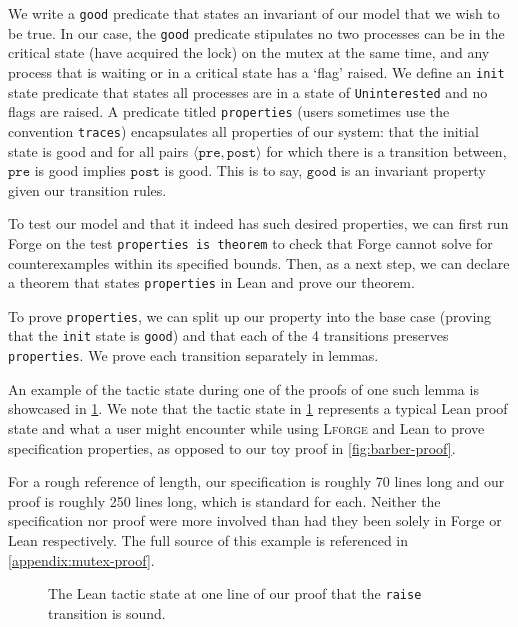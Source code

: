 We write a \texttt{good} predicate that states an invariant of our model that we wish to be true. In our case, the \texttt{good} predicate stipulates no two processes can be in the critical state (have acquired the lock) on the mutex at the same time, and any process that is waiting or in a critical state has a `flag' raised. We define an \texttt{init} state predicate that states all processes are in a state of \texttt{Uninterested} and no flags are raised. A predicate titled \texttt{properties} (users sometimes use the convention \texttt{traces}) encapsulates all properties of our system: that the initial state is good and for all pairs $\langle\texttt{pre}, \texttt{post}\rangle$ for which there is a transition between, $\texttt{pre}$ is good implies $\texttt{post}$ is good. This is to say, $\texttt{good}$ is an invariant property given our transition rules. 

To test our model and that it indeed has such desired properties, we can first run Forge on the test \texttt{properties is theorem} to check that Forge cannot solve for counterexamples within its specified bounds. Then, as a next step, we can declare a theorem that states \texttt{properties} in Lean and prove our theorem. 

To prove \texttt{properties}, we can split up our property into the base case (proving that the \texttt{init} state is \texttt{good}) and that each of the 4 transitions preserves \texttt{properties}. We prove each transition separately in lemmas. 

An example of the tactic state during one of the proofs of one such lemma is showcased in \cref{fig:mutex-proof}. We note that the tactic state in \cref{fig:mutex-proof} represents a typical Lean proof state and what a user might encounter while using \textsc{Lforge} and Lean to prove specification properties, as opposed to our toy proof in \cref{fig:barber-proof}. 

For a rough reference of length, our specification is roughly 70 lines long and our proof is roughly 250 lines long, which is standard for each. Neither the specification nor proof were more involved than had they been solely in Forge or Lean respectively. The full source of this example is referenced in \cref{appendix:mutex-proof}. 

\begin{figure}[h!]
  \centering
  \caption{The Lean tactic state at one line of our proof that the \texttt{raise} transition is sound. }
  \label{fig:mutex-proof}
\end{figure}


